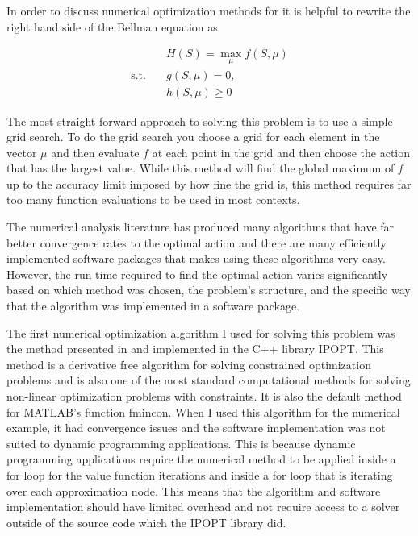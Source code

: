 \documentclass[12pt]{article}
\begin{document}
In order to discuss numerical optimization methods for it is helpful to rewrite the right hand side of the Bellman equation as

\begin{equation}
  \label{hdef}
  \begin{aligned}
    & H(S)=\max_{\mu} f(S,\mu) \\
    \text{s.t.}\quad & g(S, \mu)=0,\\
    & h(S,\mu) \geq 0
  \end{aligned}
\end{equation}

The most straight forward approach to solving this problem is to use a simple grid search. To do the grid search you choose a grid for each element in the vector $\mu$ and then evaluate $f$ at each point in the grid and then choose the action that has the largest value. While this method will find the global maximum of $f$ up to the accuracy limit imposed by how fine the grid is, this method requires far too many function evaluations to be used in most contexts.

The numerical analysis literature has produced many algorithms that have far better convergence rates to the optimal action and there are many efficiently implemented software packages that makes using these algorithms very easy. However, the run time required to find the optimal action varies significantly based on which method was chosen, the problem's structure, and the specific way that the algorithm was implemented in a software package.

The first numerical optimization algorithm I used for solving this problem was the method presented in \citet{ipopt} and implemented in the C++ library IPOPT. This method is a derivative free algorithm for solving constrained optimization problems and is also one of the most standard computational methods for solving non-linear optimization problems with constraints. It is also the default method for MATLAB's function fmincon. When I used this algorithm for the numerical example, it had convergence issues and the software implementation was not suited to dynamic programming applications. This is because dynamic programming applications require the numerical method to be applied inside a for loop for the value function iterations and inside a for loop that is iterating over each approximation node. This means that the algorithm and software implementation should have limited overhead and not require access to a solver outside of the source code which the IPOPT library did.
\end{document}
